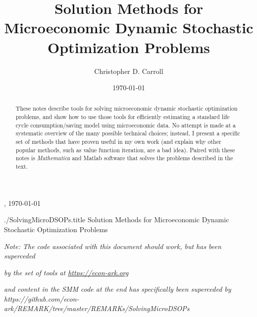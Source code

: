 \documentclass[titlepage]{\econtex}
\providecommand{\textname}{SolvingMicroDSOPs}
\begin{document}

\hfill{\tiny \jobname, \today}

\begin{verbatimwrite}{./\textname.title}
Solution Methods for Microeconomic Dynamic Stochastic Optimization Problems
\end{verbatimwrite}

\title{Solution Methods for Microeconomic Dynamic Stochastic Optimization Problems}

\author{Christopher D. Carroll\authNum}


\date{\today}
\maketitle

\centerline{\emph{Note: The code associated with this document should work, but has been superceded}}
\centerline{\emph{by the set of tools at \href{https://github.com/econ-ark/HARK}{https://econ-ark.org}}}
\centerline{\emph{and content in the SMM code at the end has specifically been superceded by https://github.com/econ-ark/REMARK/tree/master/REMARKs/SolvingMicroDSOPs}}

\hypertarget{Abstract}{}
\begin{abstract}
  These notes describe tools for solving microeconomic dynamic
  stochastic optimization problems, and show how to use those tools
  for efficiently estimating a standard life cycle consumption/saving model
  using microeconomic data.  No attempt is made at a systematic
  overview of the many possible technical choices; instead, I present
  a specific set of methods that have proven useful in my own work
  (and explain why other popular methods, such as value function
  iteration, are a bad idea).  Paired with these notes is \textit{Mathematica} and Matlab software that solves the problems
  described in the text.
\end{abstract}
\end{document}
